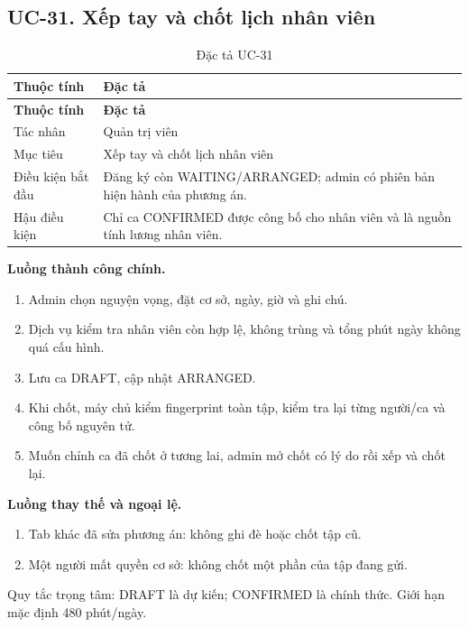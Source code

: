 \clearpage

\subsection{UC-31.\allowbreak{} Xếp tay và chốt lịch nhân viên}
\label{uc:31}

{\small\setlength{\tabcolsep}{3pt}\renewcommand{\arraystretch}{1.12}
\begin{longtable}{@{}L{\textwidth-1.32pt\relax} L{\textwidth-4.68pt\relax}@{}}
\caption{Đặc tả UC-31}\\
\toprule
\textbf{Thuộc tính} & \textbf{Đặc tả}\\\midrule
\endfirsthead
\toprule
\textbf{Thuộc tính} & \textbf{Đặc tả}\\\midrule
\endhead
\bottomrule\endlastfoot
Tác nhân & Quản trị viên\\[3pt]
Mục tiêu & Xếp tay và chốt lịch nhân viên\\[3pt]
Điều kiện bắt đầu & Đăng ký còn WAITING/\allowbreak{}ARRANGED; admin có phiên bản hiện hành của phương án.\allowbreak{}\\[3pt]
Hậu điều kiện & Chỉ ca CONFIRMED được công bố cho nhân viên và là nguồn tính lương nhân viên.\allowbreak{}\\[3pt]
\end{longtable}}
\noindent\textbf{Luồng thành công chính.}
\begin{enumerate}
\item Admin chọn nguyện vọng, đặt cơ sở, ngày, giờ và ghi chú.\allowbreak{}
\item Dịch vụ kiểm tra nhân viên còn hợp lệ, không trùng và tổng phút ngày không quá cấu hình.\allowbreak{}
\item Lưu ca DRAFT, cập nhật ARRANGED.\allowbreak{}
\item Khi chốt, máy chủ kiểm fingerprint toàn tập, kiểm tra lại từng người/\allowbreak{}ca và công bố nguyên tử.\allowbreak{}
\item Muốn chỉnh ca đã chốt ở tương lai, admin mở chốt có lý do rồi xếp và chốt lại.\allowbreak{}
\end{enumerate}
\noindent\textbf{Luồng thay thế và ngoại lệ.}
\begin{enumerate}
\item Tab khác đã sửa phương án:\allowbreak{} không ghi đè hoặc chốt tập cũ.\allowbreak{}
\item Một người mất quyền cơ sở:\allowbreak{} không chốt một phần của tập đang gửi.\allowbreak{}
\end{enumerate}
Quy tắc trọng tâm:\allowbreak{} DRAFT là dự kiến; CONFIRMED là chính thức.\allowbreak{} Giới hạn mặc định 480 phút/\allowbreak{}ngày.\allowbreak{}


